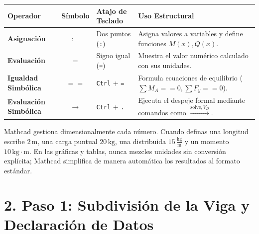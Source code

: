 \documentclass[10pt,a4paper]{article}
\begin{document}
\begin{table}[h!]
\centering
\small
\begin{tabularx}{\textwidth}{lcp{6.5cm}X}
\toprule
\textbf{Operador} & \textbf{Símbolo} & \textbf{Atajo de Teclado} & \textbf{Uso Estructural} \\
\midrule
\textbf{Asignación} & $:=$ & Dos puntos (\texttt{:}) & Asigna valores a variables y define funciones $M(x), Q(x)$. \\
\textbf{Evaluación} & $=$ & Signo igual (\texttt{=}) & Muestra el valor numérico calculado con sus unidades. \\
\textbf{Igualdad Simbólica} & $==$ & \texttt{Ctrl} + \texttt{=} & Formula ecuaciones de equilibrio ($\sum M_A == 0, \sum F_y == 0$). \\
\textbf{Evaluación Simbólica} & $\rightarrow$ & \texttt{Ctrl} + \texttt{.} & Ejecuta el despeje formal mediante comandos como $\xrightarrow{\text{solve}, V_D}$. \\
\bottomrule
\end{tabularx}
\end{table}

\begin{tipbox}
Mathcad gestiona dimensionalmente cada número. Cuando definas una longitud escribe $2\,\text{m}$, una carga puntual $20\,\text{kg}$, una distribuida $15\,\frac{\text{kg}}{\text{m}}$ y un momento $10\,\text{kg}\cdot\text{m}$. En las gráficas y tablas, nunca mezcles unidades sin conversión explícita; Mathcad simplifica de manera automática los resultados al formato estándar.
\end{tipbox}

\vspace{6pt}

\section{\color{NavyBlue}2. Paso 1: Subdivisión de la Viga y Declaración de Datos}
\end{document}
